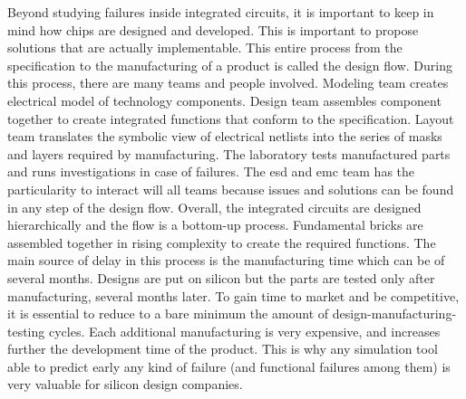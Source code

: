 Beyond studying failures inside integrated circuits, it is important to keep in mind how chips are designed and developed.
This is important to propose solutions that are actually implementable.
This entire process from the specification to the manufacturing of a product is called the design flow.
During this process, there are many teams and people involved.
Modeling team creates electrical model of technology components.
Design team assembles component together to create integrated functions that conform to the specification.
Layout team translates the symbolic view of electrical netlists into the series of masks and layers required by manufacturing.
The laboratory tests manufactured parts and runs investigations in case of failures.
The \gls{esd} and \gls{emc} team has the particularity to interact will all teams because issues and solutions can be found in any step of the design flow.
Overall, the integrated circuits are designed hierarchically and the flow is a bottom-up process.
Fundamental bricks are assembled together in rising complexity to create the required functions.
The main source of delay in this process is the manufacturing time which can be of several months.
Designs are put on silicon but the parts are tested only after manufacturing, several months later.
To gain time to market and be competitive, it is essential to reduce to a bare minimum the amount of design-manufacturing-testing cycles.
Each additional manufacturing is very expensive, and increases further the development time of the product.
This is why any simulation tool able to predict early any kind of failure (and functional failures among them) is very valuable for silicon design companies.

